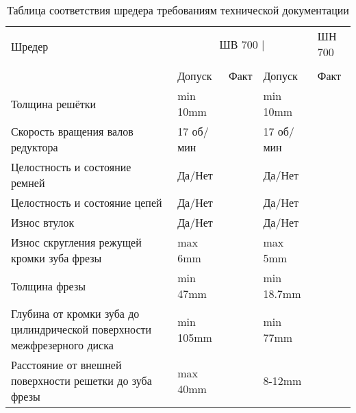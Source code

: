 %

\begin{table}[H]
	\caption{\label{tab:bolts} Таблица соответствия шредера требованиям технической документации}
	\centering
	\begin{tabular}{p{68mm}|p{21mm}|p{15mm}|p{21mm}|p{15mm}}
		\toprule
		\multirow{2}{*}{Шредер} & \multicolumn{3}{c}{ ШВ 700 |} & ШН 700\\
		\cmidrule{2-4} \cmidrule{5-5} \\
		{} & Допуск  & Факт & Допуск  & Факт \\
		\midrule
		Толщина решётки & min 10mm  &  & min 10mm  &  \\
		Скорость вращения валов редуктора & 17 об/мин &  & 17 об/мин &  \\
		Целостность и состояние ремней & Да/Нет &  & Да/Нет &  \\
		Целостность и состояние цепей & Да/Нет &  & Да/Нет &  \\
		Износ втулок & Да/Нет &  & Да/Нет &  \\
		Износ скругления режущей кромки зуба фрезы & max 6mm &  & max 5mm &  \\
		Толщина фрезы & min 47mm &  & min 18.7mm &  \\
		Глубина от кромки зуба до цилиндрической поверхности межфрезерного диска  & min 105mm &  & min 77mm &  \\
		Расстояние от внешней поверхности решетки до зуба фрезы & max 40mm &  & 8-12mm &  \\
		\bottomrule
	\end{tabular}
\end{table}


